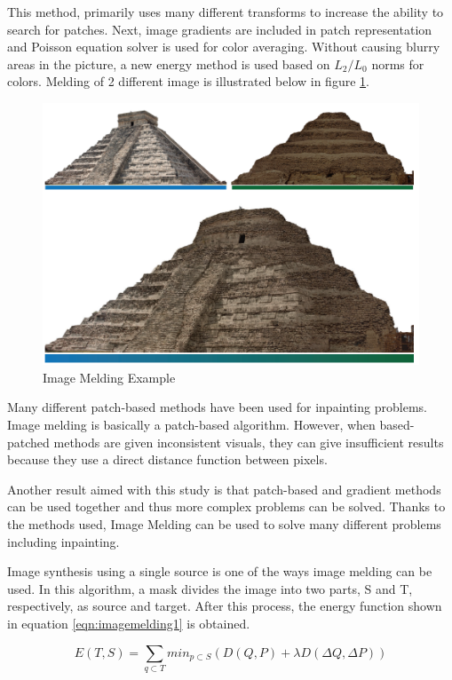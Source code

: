 This method, primarily uses many different transforms to increase the ability to search for patches. Next, image gradients are included in patch representation and Poisson equation solver is used for color averaging. Without causing blurry areas in the picture, a new energy method is used based on \(L_2/L_0\) norms for colors. Melding of 2 different image is illustrated below in figure \ref{fig:image-melding-example}.

\begin{figure}[h]
    \centering
    \includegraphics{figures/chapter2/Image-Melding.png}
    \caption{Image Melding Example}
    \label{fig:image-melding-example}
\end{figure}

Many different patch-based methods have been used for inpainting problems. Image melding is basically a patch-based algorithm. However, when based-patched methods are given inconsistent visuals, they can give insufficient results because they use a direct distance function between pixels.

Another result aimed with this study is that patch-based and gradient methods can be used together and thus more complex problems can be solved. Thanks to the methods used, Image Melding can be used to solve many different problems including inpainting.

Image synthesis using a single source is one of the ways image melding can be used. In this algorithm, a mask divides the image into two parts, S and T, respectively, as source and target. After this process, the energy function shown in equation \ref{eqn:imagemelding1} is obtained.

\begin{equation}
    \label{eqn:imagemelding1}
    E(T,S) = \sum\limits_{q\subset T}{min_{p\subset S}(D(Q,P)+\lambda D(\Delta Q, \Delta P))}
\end{equation}

